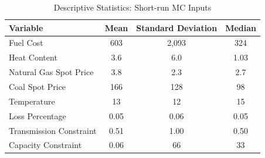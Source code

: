 \documentclass[12pt]{article}
\begin{document}
\begin{table}[htbp]
\centering
\begin{tabular}{lccc}
\toprule
\textbf{Variable} & \textbf{Mean} & \textbf{Standard Deviation} & \textbf{Median} \\
\midrule
Fuel Cost & 603 & 2{,}093 & 324 \\
Heat Content & 3.6 & 6.0 & 1.03 \\
Natural Gas Spot Price & 3.8 & 2.3 & 2.7 \\
Coal Spot Price & 166 & 128 & 98 \\
Temperature & 13 & 12 & 15 \\
Loss Percentage & 0.05 & 0.06 & 0.05 \\
Transmission Constraint & 0.51 & 1.00 & 0.50 \\
Capacity Constraint & 0.06 & 66 & 33 \\
\bottomrule
\end{tabular}
\caption{Descriptive Statistics: Short-run MC Inputs}
\label{ShortTermStats2}
\end{table}
\end{document}
